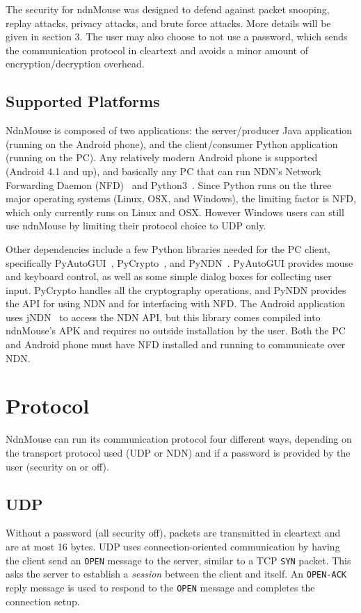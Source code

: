 \documentclass{sig-alternate}
\renewcommand\_{\textunderscore\allowbreak}  %
\begin{document}
The security for ndnMouse was designed to defend against packet snooping, replay attacks, privacy attacks, and brute force attacks. More details will be given in section 3. The user may also choose to not use a password, which sends the communication protocol in cleartext and avoids a minor amount of encryption/decryption overhead. 

\subsection{Supported Platforms}
NdnMouse is composed of two applications: the server/producer Java application (running on the Android phone), and the client/consumer Python application (running on the PC). Any relatively modern Android phone is supported (Android 4.1 and up), and basically any PC that can run NDN's Network Forwarding Daemon (NFD)~\cite{nfd} and Python3~\cite{python3}. Since Python runs on the three major operating systems (Linux, OSX, and Windows), the limiting factor is NFD, which only currently runs on Linux and OSX. However Windows users can still use ndnMouse by limiting their protocol choice to UDP only.

Other dependencies include a few Python libraries needed for the PC client, specifically PyAutoGUI~\cite{pyautogui}, PyCrypto~\cite{pycrypto}, and PyNDN~\cite{pyndn}. PyAutoGUI provides mouse and keyboard control, as well as some simple dialog boxes for collecting user input. PyCrypto handles all the cryptography operations, and PyNDN provides the API for using NDN and for interfacing with NFD. The Android application uses jNDN~\cite{jndn} to access the NDN API, but this library comes compiled into ndnMouse's APK and requires no outside installation by the user. Both the PC and Android phone must have NFD installed and running to communicate over NDN.

\section{Protocol}
NdnMouse can run its communication protocol four different ways, depending on the transport protocol used (UDP or NDN) and if a password is provided by the user (security on or off).

\subsection{UDP}
Without a password (all security off), packets are transmitted in cleartext and are at most 16 bytes. UDP uses connection-oriented communication by having the client send an \texttt{OPEN} message to the server, similar to a TCP \texttt{SYN} packet. This asks the server to establish a \textit{session} between the client and itself. An \texttt{OPEN-ACK} reply message is used to respond to the \texttt{OPEN} message and completes the connection setup.
\end{document}
